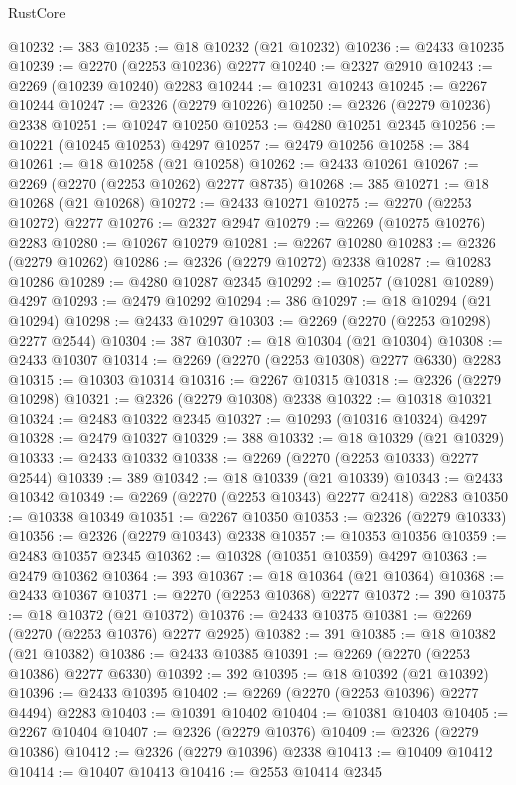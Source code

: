 \begin{lexlean}{RustCore}
\begin{coremodule}
@10232 := 383
@10235 := @18 @10232 (@21 @10232)
@10236 := @2433 @10235
@10239 := @2270 (@2253 @10236) @2277
@10240 := @2327 @2910
@10243 := @2269 (@10239 @10240) @2283
@10244 := @10231 @10243
@10245 := @2267 @10244
@10247 := @2326 (@2279 @10226)
@10250 := @2326 (@2279 @10236) @2338
@10251 := @10247 @10250
@10253 := @4280 @10251 @2345
@10256 := @10221 (@10245 @10253) @4297
@10257 := @2479 @10256
@10258 := 384
@10261 := @18 @10258 (@21 @10258)
@10262 := @2433 @10261
@10267 := @2269 (@2270 (@2253 @10262) @2277 @8735)
@10268 := 385
@10271 := @18 @10268 (@21 @10268)
@10272 := @2433 @10271
@10275 := @2270 (@2253 @10272) @2277
@10276 := @2327 @2947
@10279 := @2269 (@10275 @10276) @2283
@10280 := @10267 @10279
@10281 := @2267 @10280
@10283 := @2326 (@2279 @10262)
@10286 := @2326 (@2279 @10272) @2338
@10287 := @10283 @10286
@10289 := @4280 @10287 @2345
@10292 := @10257 (@10281 @10289) @4297
@10293 := @2479 @10292
@10294 := 386
@10297 := @18 @10294 (@21 @10294)
@10298 := @2433 @10297
@10303 := @2269 (@2270 (@2253 @10298) @2277 @2544)
@10304 := 387
@10307 := @18 @10304 (@21 @10304)
@10308 := @2433 @10307
@10314 := @2269 (@2270 (@2253 @10308) @2277 @6330) @2283
@10315 := @10303 @10314
@10316 := @2267 @10315
@10318 := @2326 (@2279 @10298)
@10321 := @2326 (@2279 @10308) @2338
@10322 := @10318 @10321
@10324 := @2483 @10322 @2345
@10327 := @10293 (@10316 @10324) @4297
@10328 := @2479 @10327
@10329 := 388
@10332 := @18 @10329 (@21 @10329)
@10333 := @2433 @10332
@10338 := @2269 (@2270 (@2253 @10333) @2277 @2544)
@10339 := 389
@10342 := @18 @10339 (@21 @10339)
@10343 := @2433 @10342
@10349 := @2269 (@2270 (@2253 @10343) @2277 @2418) @2283
@10350 := @10338 @10349
@10351 := @2267 @10350
@10353 := @2326 (@2279 @10333)
@10356 := @2326 (@2279 @10343) @2338
@10357 := @10353 @10356
@10359 := @2483 @10357 @2345
@10362 := @10328 (@10351 @10359) @4297
@10363 := @2479 @10362
@10364 := 393
@10367 := @18 @10364 (@21 @10364)
@10368 := @2433 @10367
@10371 := @2270 (@2253 @10368) @2277
@10372 := 390
@10375 := @18 @10372 (@21 @10372)
@10376 := @2433 @10375
@10381 := @2269 (@2270 (@2253 @10376) @2277 @2925)
@10382 := 391
@10385 := @18 @10382 (@21 @10382)
@10386 := @2433 @10385
@10391 := @2269 (@2270 (@2253 @10386) @2277 @6330)
@10392 := 392
@10395 := @18 @10392 (@21 @10392)
@10396 := @2433 @10395
@10402 := @2269 (@2270 (@2253 @10396) @2277 @4494) @2283
@10403 := @10391 @10402
@10404 := @10381 @10403
@10405 := @2267 @10404
@10407 := @2326 (@2279 @10376)
@10409 := @2326 (@2279 @10386)
@10412 := @2326 (@2279 @10396) @2338
@10413 := @10409 @10412
@10414 := @10407 @10413
@10416 := @2553 @10414 @2345

\end{coremodule}
\end{lexlean}
